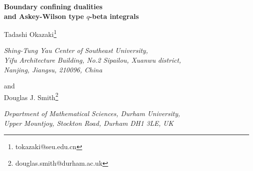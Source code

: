 \documentclass[12pt]{article}
\numberwithin{equation}{section}
\begin{document}
\thispagestyle{empty}
\begin{flushright}


\end{flushright}
\vskip1.5cm
\begin{center}
{\Large \bf 
Boundary confining dualities
\\
\vskip0.75cm
and Askey-Wilson type $q$-beta integrals}



\vskip1.5cm
Tadashi Okazaki\footnote{tokazaki@seu.edu.cn}

\bigskip
{\it Shing-Tung Yau Center of Southeast University,\\
Yifu Architecture Building, No.2 Sipailou, Xuanwu district, \\
Nanjing, Jiangsu, 210096, China
}

\bigskip
and
\\
\bigskip
Douglas J. Smith\footnote{douglas.smith@durham.ac.uk}

\bigskip
{\it Department of Mathematical Sciences, Durham University,\\
Upper Mountjoy, Stockton Road, Durham DH1 3LE, UK}


\end{center}

\vskip1cm
\begin{abstract}
We propose confining dualities of $\mathcal{N}=(0,2)$ half-BPS boundary conditions in 3d $\mathcal{N}=2$ supersymmetric $SU(N)$, $USp(2n)$ and $SO(N)$ gauge theories. Some of these dualities have the novel feature that one (anti)fundamental chiral has Dirichlet boundary condition while the rest have Neumann boundary conditions. While some of the dualities can be extended to 3d bulk dualities, others should be understood intrinsically as 2d dualities as they seem to hold only at the boundary. 
The gauge theory Neumann half-indices are well-defined even for theories which contain monopole operators with non-positive scaling dimensions and they are given by Askey-Wilson type $q$-beta integrals. As a consequence of the confining dualities, new conjectural identities of such integrals are found. 
\end{abstract}

\newpage
\setcounter{tocdepth}{3}
\tableofcontents
\end{document}
